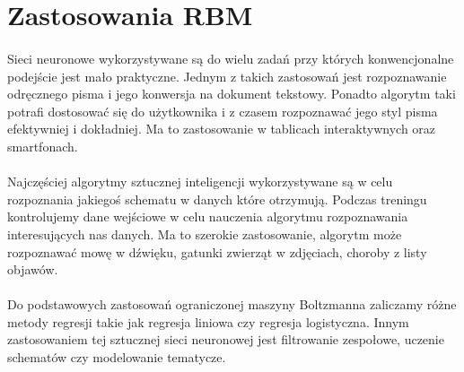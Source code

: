 \section{Zastosowania RBM}
    \paragraph{}
        Sieci neuronowe wykorzystywane są do wielu zadań przy których konwencjonalne
        podejście jest mało praktyczne. Jednym z takich zastosowań jest rozpoznawanie
        odręcznego pisma i jego konwersja na dokument tekstowy. Ponadto algorytm taki
        potrafi dostosować się do użytkownika i z czasem rozpoznawać jego styl pisma
        efektywniej i dokładniej. Ma to zastosowanie w tablicach interaktywnych oraz
        smartfonach.

    \paragraph{}
        Najczęściej algorytmy sztucznej inteligencji wykorzystywane są w celu rozpoznania
        jakiegoś schematu w danych które otrzymują. Podczas treningu kontrolujemy dane wejściowe
        w celu nauczenia algorytmu rozpoznawania interesujących nas danych. Ma to szerokie zastosowanie,
        algorytm może rozpoznawać mowę w dźwięku, gatunki zwierząt w zdjęciach, choroby z listy objawów.
	\paragraph{}
	    Do podstawowych zastosowań ograniczonej maszyny Boltzmanna zaliczamy różne metody regresji takie
        jak regresja liniowa czy regresja logistyczna. Innym zastosowaniem tej sztucznej sieci neuronowej
        jest filtrowanie zespołowe, uczenie schematów czy modelowanie tematycze.